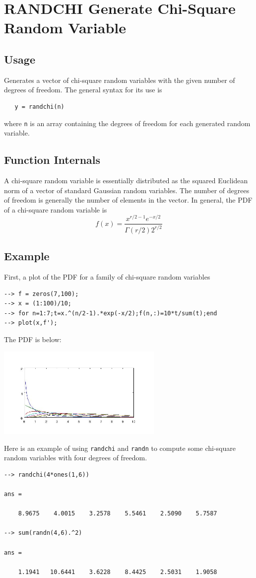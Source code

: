 \section{RANDCHI Generate Chi-Square Random Variable}

\subsection{Usage}

Generates a vector of chi-square random variables with the
given number of degrees of freedom.  The general syntax for
its use is 
\begin{verbatim}
   y = randchi(n)
\end{verbatim}
where \verb|n| is an array containing the degrees of freedom for
each generated random variable.
\subsection{Function Internals}

A chi-square random variable is essentially distributed as
the squared Euclidean norm of a vector of standard Gaussian random 
variables.  The number of degrees of freedom is generally the
number of elements in the vector.  In general, the PDF of
a chi-square random variable is
\[
 f(x) = \frac{x^{r/2-1}e^{-x/2}}{\Gamma(r/2)2^{r/2}}
\]
\subsection{Example}

First, a plot of the PDF for a family of chi-square random variables
\begin{verbatim}
--> f = zeros(7,100);
--> x = (1:100)/10;
--> for n=1:7;t=x.^(n/2-1).*exp(-x/2);f(n,:)=10*t/sum(t);end
--> plot(x,f');
\end{verbatim}
The PDF is below:


\centerline{\includegraphics[width=8cm]{chipdf}}

Here is an example of using \verb|randchi| and \verb|randn| to compute
some chi-square random variables with four degrees of freedom.
\begin{verbatim}
--> randchi(4*ones(1,6))

ans = 

    8.9675    4.0015    3.2578    5.5461    2.5090    5.7587 

--> sum(randn(4,6).^2)

ans = 

    1.1941   10.6441    3.6228    8.4425    2.5031    1.9058 
\end{verbatim}

